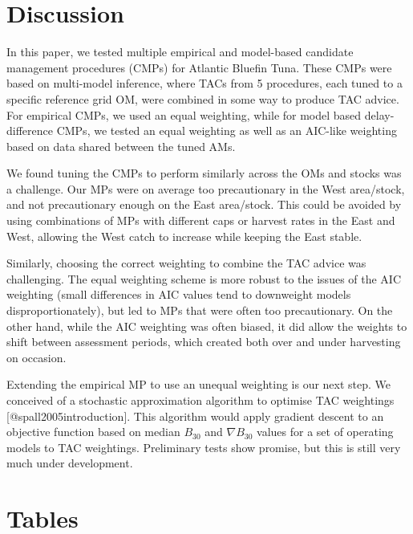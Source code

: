 \documentclass[]{article}
\begin{document}
\hypertarget{discussion}{%
\section{Discussion}\label{discussion}}

In this paper, we tested multiple empirical and model-based
candidate management procedures (CMPs) for Atlantic Bluefin Tuna. These
CMPs were based on multi-model inference, where TACs from
5 procedures, each tuned to a specific reference grid OM, were
combined in some way to produce TAC advice. For empirical CMPs,
we used an equal weighting, while for model based delay-difference
CMPs, we tested an equal weighting as well as an AIC-like
weighting based on data shared between the tuned AMs.

We found tuning the CMPs to perform
similarly across the OMs and stocks was a challenge.
Our MPs were on average too precautionary in the
West area/stock, and not precautionary enough on the East
area/stock. This could be avoided by using combinations
of MPs with different caps or harvest rates in the East and West,
allowing the West catch to increase while keeping the East stable.

Similarly, choosing the correct weighting to combine
the TAC advice was challenging. The equal weighting scheme
is more robust to the issues of the AIC weighting (small differences
in AIC values tend to downweight models disproportionately),
but led to MPs that were often too precautionary. On the other
hand, while the AIC weighting was often biased, it did allow
the weights to shift between assessment periods, which created
both over and under harvesting on occasion.

Extending the empirical MP to use an unequal weighting is
our next step. We conceived of a stochastic approximation
algorithm to optimise TAC weightings {[}@spall2005introduction{]}.
This algorithm would apply gradient descent to an objective
function based on median \(B_{30}\) and \(\nabla B_{30}\) values
for a set of operating models to TAC weightings. Preliminary
tests show promise, but this is still very much under development.

\newpage

\hypertarget{tables}{%
\section{Tables}\label{tables}}
\end{document}
